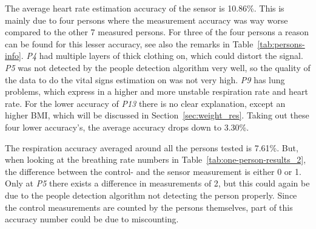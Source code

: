 The average heart rate estimation accuracy of the sensor is 10.86\%. This is mainly due to four persons where the measurement accuracy was way worse compared to the other 7 measured persons. For three of the four persons a reason can be found for this lesser accuracy, see also the remarks in Table~\ref{tab:persons-info}. \emph{P4} had multiple layers of thick clothing on, which could distort the signal. \emph{P5} was not detected by the people detection algorithm very well, so the quality of the data to do the vital signs estimation on was not very high. \emph{P9} has lung problems, which express in a higher and more unstable respiration rate and heart rate. For the lower accuracy of \emph{P13} there is no clear explanation, except an higher BMI, which will be discussed in Section~\ref{sec:weight_res}. Taking out these four lower accuracy's, the average accuracy drops down to 3.30\%.

The respiration accuracy averaged around all the persons tested is 7.61\%. But, when looking at the breathing rate numbers in Table~\ref{tab:one-person-results_2}, the difference between the control- and the sensor measurement is either 0 or 1. Only at \emph{P5} there exists a difference in measurements of 2, but this could again be due to the people detection algorithm not detecting the person properly. Since the control measurements are counted by the persons themselves, part of this accuracy number could be due to miscounting.


